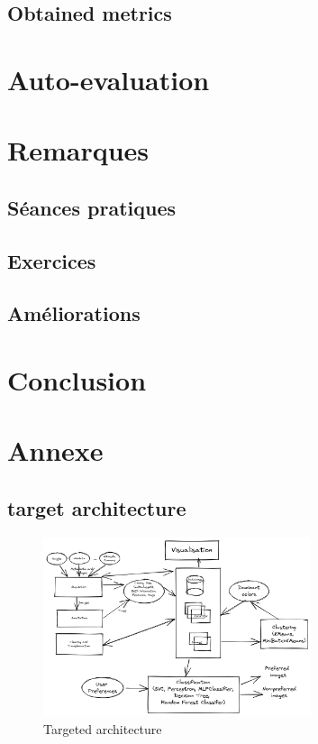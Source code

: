 \documentclass{article}
\begin{document}
    \subsection{Obtained metrics}\label{subsec:metrics}


    \section{Auto-evaluation}\label{sec:autoeval}


    \section{Remarques}\label{sec:remarques}

    \subsection{Séances pratiques}\label{subsec:seances}

    \subsection{Exercices}\label{subsec:exercices}

    \subsection{Améliorations}\label{subsec:ameliorations}


    \section{Conclusion}\label{sec:conclusion}

    \newpage
    \appendix


    \section{Annexe}\label{sec:annexe}

    \subsection{target architecture}\label{subsec:target_architecture}

    \begin{figure}[htbp]
        \centering
        \includegraphics[width=0.7\textwidth]{targeted_archi}
        \caption{Targeted architecture}
        \label{fig:targeted_architecture}
    \end{figure}
\end{document}
